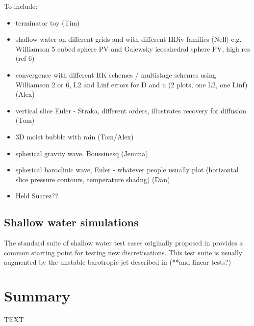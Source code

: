 \documentclass[journal abbreviation, manuscript]{copernicus}
\begin{document}
To include:
\begin{itemize}
\item terminator toy (Tim)
\item shallow water on different grids and with different HDiv
  families (Nell) e.g. Williamson 5 cubed sphere PV and Galewsky
  icosahedral sphere PV, high res (ref 6)
\item convergence with different RK schemes / multistage schemes using
  Williamson 2 or 6, L2 and Linf errors for D and u (2 plots, one L2,
  one Linf) (Alex)
\item vertical slice Euler - Straka, different orders, illustrates
  recovery for diffusion (Tom)
\item 3D moist bubble with rain (Tom/Alex)
\item spherical gravity wave, Boussinesq (Jemma)
\item spherical baroclinic wave, Euler - whatever people usually plot
  (horizontal slice pressure contours, temperature shadng) (Dan)
\item Held Suarez??
\end{itemize}

\subsection{Shallow water simulations}
The standard suite of shallow water test cases originally proposed in
\citet{williamson1992standard} provides a common starting point for
testing new discretisations. This test suite is usually augmented by
the unstable barotropic jet described in \citet{galewsky2004initial}
(**and linear tests?)





\section{Summary}
\label{sec: summary}


\conclusions  %
TEXT


\end{document}
